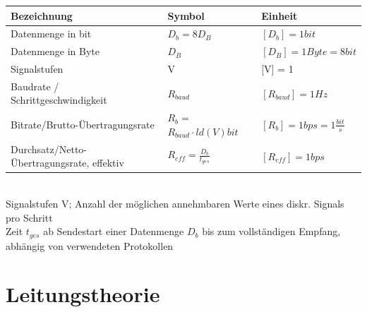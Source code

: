 \documentclass[fs, footer]{latex4ei}
\begin{document}
\begin{multicols*}{4}
{\begin{tabular*}{\columnwidth}{p{1.8cm} | p{1.6cm} | p{2.5cm}}
	Bezeichnung & Symbol & Einheit \\ \hline
	Datenmenge in bit & $D_b = 8 D_B $ & $[D_b] = 1 bit$   \\ \hline
	Datenmenge in Byte & $D_B$ & $[D_B] = 1 Byte = 8 bit  $  \\ \hline
	Signalstufen & V & [V] = 1   \\ \hline
	Baudrate / Schrittgeschwindigkeit & $R_{baud}$ & $[R_{baud}] = 1 Hz $   \\ \hline
	Bitrate/Brutto-Übertragungsrate & $R_b = $$ R_{baud} \cdot ld(V) bit $ & $[R_b] = 1 bps = 1 \frac{bit}{s} $  \\ \hline
	Durchsatz/Netto-Übertragungsrate, effektiv & $R_{eff} = \frac{D_b}{t_{ges}}$ & $[R_{eff}] = 1 bps $ \\
	
	
\end{tabular*}\\

	Signalstufen V; Anzahl der möglichen annehmbaren Werte eines diskr. Signals pro Schritt \\
	Zeit $t_{ges}$ ab Sendestart einer Datenmenge $D_b$ bis zum vollständigen Empfang, abhängig von verwendeten Protokollen \\
	
		


}

\section{Leitungstheorie}

\end{multicols*}
\end{document}

